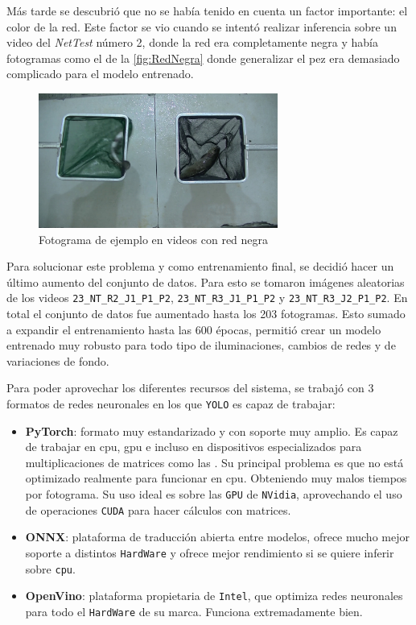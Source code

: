 Más tarde se descubrió que no se había tenido en cuenta un factor importante: el color de la red. Este factor se vio cuando se intentó realizar inferencia sobre un video del \textit{NetTest} número 2, donde 
la red era completamente negra y había fotogramas como el de la \autoref{fig:RedNegra} donde generalizar el pez era demasiado complicado para el modelo entrenado.

\begin{figure}[H]
    \centering
    \includegraphics[width=0.7\textwidth]{images/6/6.3/RedNegra.jpg}
    \caption{Fotograma de ejemplo en videos con red negra}
    \label{fig:RedNegra}
\end{figure}

Para solucionar este problema y como entrenamiento final, se decidió hacer un último aumento del conjunto de datos. Para esto se tomaron imágenes aleatorias de los videos \verb|23_NT_R2_J1_P1_P2|, 
\verb|23_NT_R3_J1_P1_P2| y \verb|23_NT_R3_J2_P1_P2|. En total el conjunto de datos fue aumentado hasta los 203 fotogramas.\newline
Esto sumado a expandir el entrenamiento hasta las 600 épocas, permitió crear un modelo entrenado muy robusto para todo tipo de iluminaciones, cambios de redes y de variaciones de fondo.



\clearpage

Para poder aprovechar los diferentes recursos del sistema, se trabajó con 3 formatos de redes neuronales en los que \texttt{YOLO} es capaz de trabajar:
\begin{itemize}
    \item \textbf{PyTorch}: formato muy estandarizado y con soporte muy amplio. Es capaz de trabajar en \acrshort{cpu}, \acrshort{gpu} e incluso en dispositivos especializados para multiplicaciones de matrices como 
    las . Su principal problema es que no está optimizado realmente para funcionar en \acrshort{cpu}. Obteniendo muy malos tiempos por fotograma. Su uso ideal es sobre las \texttt{GPU} de \texttt{NVidia}, 
    aprovechando el uso de operaciones \texttt{CUDA} para hacer cálculos con matrices. 
    \item \textbf{ONNX}: plataforma de traducción abierta entre modelos, ofrece mucho mejor soporte a distintos \texttt{HardWare} y ofrece mejor rendimiento si se quiere inferir sobre \texttt{cpu}.
    \item \textbf{OpenVino}: plataforma propietaria de \texttt{Intel}, que optimiza redes neuronales para todo el \texttt{HardWare} de su marca. Funciona extremadamente bien.
\end{itemize}

